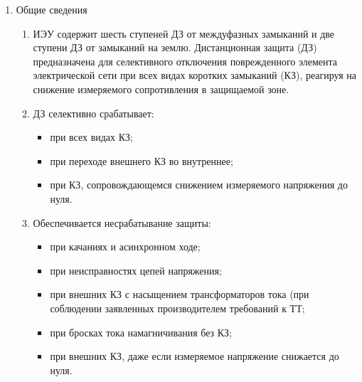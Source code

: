 \color{black}

\begin{enumerate}[label=\arabic{section}.\arabic{subsection}.\arabic{enumi}, labelsep=4pt, leftmargin=0pt, itemindent=57pt, itemsep=0pt, parsep=5pt] %
\item Общие сведения

\begin{enumerate}[label=\arabic{section}.\arabic{subsection}.\arabic{enumi}.\arabic*, labelsep=4pt, leftmargin=0em, itemindent=65pt, parsep=0pt]

\item
ИЭУ содержит шесть ступеней ДЗ от междуфазных замыканий и две ступени ДЗ от замыканий на
землю. Дистанционная  защита  (ДЗ)  предназначена  для  селективного  отключения  поврежденного  элемента
электрической  сети  при  всех видах  коротких  замыканий (КЗ),  реагируя  на снижение измеряемого
сопротивления в защищаемой зоне.

\item 
ДЗ селективно срабатывает:
\begin{itemize}
    \item при всех видах КЗ; 
    \item при переходе внешнего КЗ во внутреннее; 
    \item при КЗ, сопровождающемся снижением измеряемого напряжения до нуля.
\end{itemize}

\item 
Обеспечивается несрабатывание защиты:
\begin{itemize} 
\item при качаниях и асинхронном ходе; 
\item при неисправностях цепей напряжения;
\item при внешних КЗ с насыщением трансформаторов тока (при соблюдении заявленных производителем требований к ТТ; 
\item при бросках тока намагничивания без КЗ;
\item при внешних КЗ, даже если измеряемое напряжение снижается до нуля.
\end{itemize}


\end{enumerate}
\end{enumerate}

